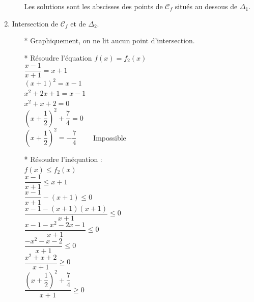 \begin{enumerate}
\begin{itemize}
Les solutions sont les abscisses des points de $\mathcal{C}_f$ situés au dessous de $\Delta_1$.\\

\end{itemize}

\newpage


\item Intersection de $\mathcal{C}_f$ et de $\Delta_2$.

\begin{itemize}
\item [*] Graphiquement, on ne lit aucun point d'intersection.

\item [*] Résoudre l'équation $f(x) = f_2(x)$\\

$ \dfrac{x - 1}{x + 1} = x + 1$\\

$ (x + 1)^2 = x - 1 $ \\
$ x^2 +2x +1  =  x -1  $ \\
$ x^2 +x +2  = 0  $ \\

$ (x + \dfrac{1}{2})^2 + \dfrac{7}{4} = 0 $ \\

$ (x + \dfrac{1}{2})^2 = -\dfrac{7}{4}  \qquad $ Impossible \\
             
\item [*] Résoudre l'inéquation : \\

$f(x) \leqslant f_2(x)$\\

$ \dfrac{x - 1}{x + 1} \leqslant  x + 1$\\

$\dfrac{x - 1}{x + 1}  - ( x + 1)  \leqslant 0 $ \\

$\dfrac{x - 1 - (x + 1)(x + 1)}{x + 1}  \leqslant 0 $ \\

$\dfrac{x - 1 - x^2 -2x -1 }{x + 1}  \leqslant 0 $ \\

$\dfrac{-x^2 -x -2 }{x + 1}  \leqslant 0 $ \\

$\dfrac{x^2 +x +2 }{x + 1}  \geqslant 0 $ \\

$ \dfrac{\left(x +\dfrac{1}{2}\right)^2 + \dfrac{7}{4} }{x + 1} \geqslant 0 $ \\


\end{itemize}
\end{enumerate}
